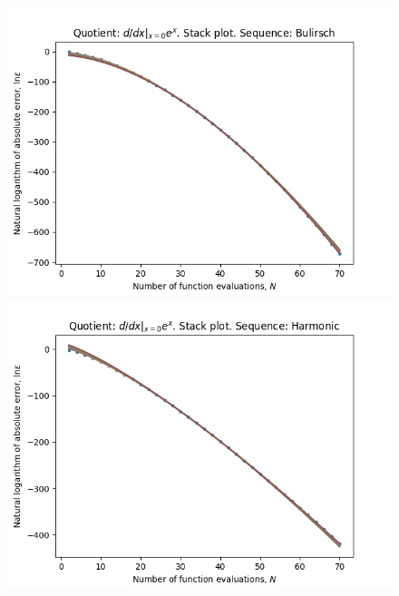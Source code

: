 \begin{figure}[H]
\centering
\begin{minipage}{0.45\textwidth}
\centering
\includegraphics[scale=0.45]{../results/diff_quot_plots/exp_0_hp_bulirsch_stack.png}
\end{minipage}
\begin{minipage}{0.45\textwidth}
\centering
\includegraphics[scale=0.45]{../results/diff_quot_plots/exp_0_hp_harmonic_stack.png}
\end{minipage}
\end{figure}

